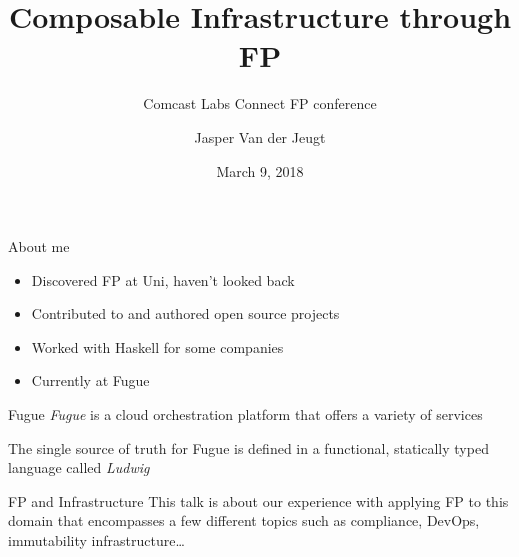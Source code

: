 \documentclass[aspectratio=169,20pt]{beamer}
\newcommand{\vspaced}{
    \vspace{5mm}
}
\begin{document}
\title{Composable Infrastructure through FP}
\subtitle{Comcast Labs Connect FP conference}
\author{Jasper Van der Jeugt}
\date{March 9, 2018}

\begin{frame}[plain]
    \titlepage
\end{frame}

\begin{frame}{About me}
    \begin{itemize}
    \item Discovered FP at Uni, haven't looked back
    \item Contributed to and authored open source projects
    \item Worked with Haskell for some companies
    \item Currently at Fugue
    \end{itemize}
\end{frame}

\begin{frame}{Fugue}
    \emph{Fugue} is a cloud orchestration platform that offers a variety of
    services \\
    \vspaced
    The single source of truth for Fugue is defined in a functional,
    statically typed language called \emph{Ludwig} \\
\end{frame}

\begin{frame}{FP and Infrastructure}
    This talk is about our experience with applying FP to this domain that
    encompasses a few different topics such as compliance, DevOps, immutability
    infrastructure\ldots
\end{frame}
\end{document}
